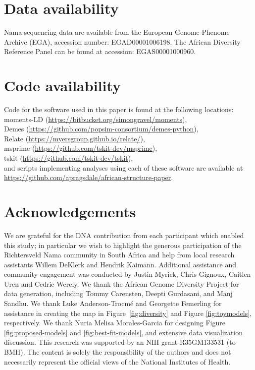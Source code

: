 \documentclass[]{article}
\begin{document}
\section*{Data availability}

Nama sequencing data are available from the European Genome-Phenome Archive (EGA),
accession number: EGAD00001006198. The African Diversity Reference Panel can be
found at accession: EGAS00001000960.

\section*{Code availability}

Code for the software used in this paper is found at the following locations:\\
moments-LD (\url{https://bitbucket.org/simongravel/moments}),\\
Demes (\url{https://github.com/popsim-consortium/demes-python}),\\
Relate (\url{https://myersgroup.github.io/relate/}),\\
msprime (\url{https://github.com/tskit-dev/msprime}),\\
tskit (\url{https://github.com/tskit-dev/tskit}),\\
and scripts implementing analyses using each of these software are available at\\
\url{https://github.com/apragsdale/african-structure-paper}.

\section*{Acknowledgements}

We are grateful for the DNA contribution from each participant which enabled
this study; in particular we wish to highlight the generous participation of
the Richtersveld Nama community in South Africa and help from local research
assistants Willem DeKlerk and Hendrik Kaimann. Additional assistance and
community engagement was conducted by Justin Myrick, Chris Gignoux, Caitlen
Uren and Cedric Werely. We thank the African Genome Diversity Project for data
generation, including Tommy Carensten, Deepti Gurdasani, and Manj Sandhu. We
thank Luke Anderson-Trocm\'e and Georgette Femerling for assistance in creating
the map in Figure~\ref{fig:diversity} and Figure \ref{fig:toymodels},
respectively. We thank Nuria Melisa Morales-Garcia for designing Figure \ref{fig:proposed-models} 
and \ref{fig:best-fit-models}, and extensive data visualization discussion. 
This research was supported by an NIH grant R35GM133531 (to BMH).
The content is solely the responsibility of the authors and does not
necessarily represent the official views of the National Institutes of Health.



\end{document}
